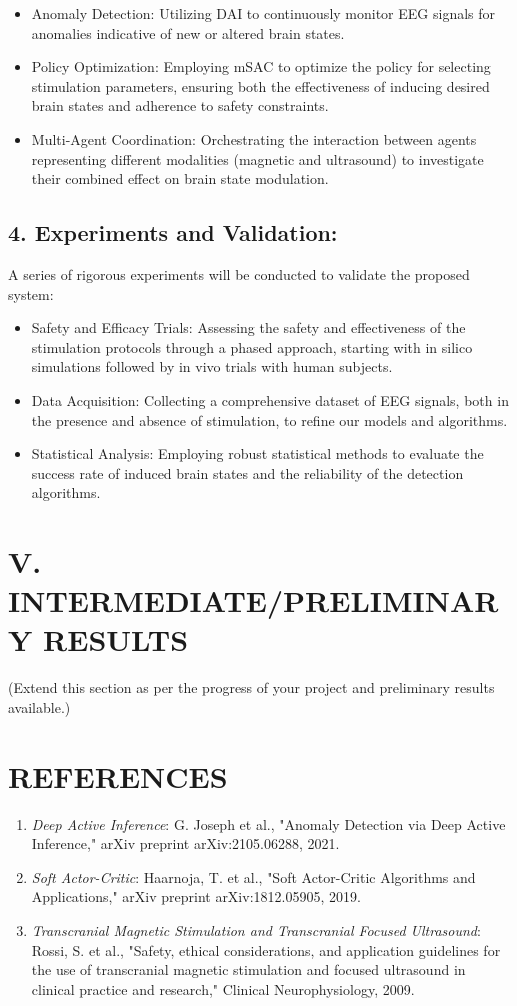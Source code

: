\documentclass{article}
\begin{document}
\begin{itemize}
    \item Anomaly Detection: Utilizing DAI to continuously monitor EEG signals for anomalies indicative of new or altered brain states.
    \item Policy Optimization: Employing mSAC to optimize the policy for selecting stimulation parameters, ensuring both the effectiveness of inducing desired brain states and adherence to safety constraints.
    \item Multi-Agent Coordination: Orchestrating the interaction between agents representing different modalities (magnetic and ultrasound) to investigate their combined effect on brain state modulation.
\end{itemize}

\subsection*{4. Experiments and Validation:}
A series of rigorous experiments will be conducted to validate the proposed system:

\begin{itemize}
    \item Safety and Efficacy Trials: Assessing the safety and effectiveness of the stimulation protocols through a phased approach, starting with in silico simulations followed by in vivo trials with human subjects.
    \item Data Acquisition: Collecting a comprehensive dataset of EEG signals, both in the presence and absence of stimulation, to refine our models and algorithms.
    \item Statistical Analysis: Employing robust statistical methods to evaluate the success rate of induced brain states and the reliability of the detection algorithms.
\end{itemize}

\section*{V. INTERMEDIATE/PRELIMINARY RESULTS}
(Extend this section as per the progress of your project and preliminary results available.)

\section*{REFERENCES}
\begin{enumerate}
    \item \textit{Deep Active Inference}: G. Joseph et al., "Anomaly Detection via Deep Active Inference," arXiv preprint arXiv:2105.06288, 2021.
    \item \textit{Soft Actor-Critic}: Haarnoja, T. et al., "Soft Actor-Critic Algorithms and Applications," arXiv preprint arXiv:1812.05905, 2019.
    \item \textit{Transcranial Magnetic Stimulation and Transcranial Focused Ultrasound}: Rossi, S. et al., "Safety, ethical considerations, and application guidelines for the use of transcranial magnetic stimulation and focused ultrasound in clinical practice and research," Clinical Neurophysiology, 2009.
\end{enumerate}
\end{document}
